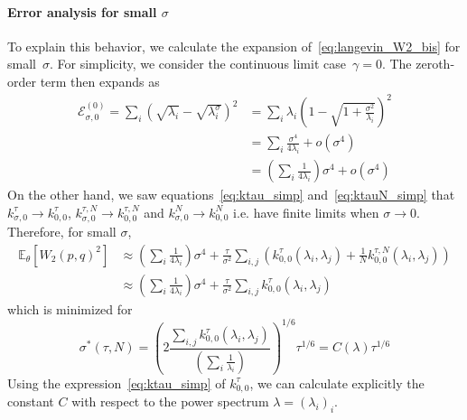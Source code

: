 \documentclass[11pt]{article}
\begin{document}
\paragraph{Error analysis for small $\sigma$}  To explain this behavior, we calculate the expansion of~\eqref{eq:langevin_W2_bis} for small~$\sigma$. For simplicity, we consider the continuous limit case~$\gamma = 0$. The zeroth-order term then expands as
\begin{align*}
    \mathcal{E}^{(0)}_{\sigma, 0} = \sum_i \left(\sqrt{\lambda_i} - \sqrt{\lambda_i^\sigma}\right)^2 &= \sum_i  \lambda_i \left( 1 - \sqrt{1 + \frac{\sigma^2}{\lambda_i}}\right)^2 \\
    &= \sum_i  \frac{\sigma^4}{4 \lambda_i} + o(\sigma^4) \\
    &= \left( \sum_i\frac{1}{4 \lambda_i} \right)\sigma^4 + o(\sigma^4)
\end{align*}
On the other hand, we saw equations~\eqref{eq:ktau_simp} and~\eqref{eq:ktauN_simp} that $k^\tau_{\sigma, 0} \to k^\tau_{0, 0}$, $k^{\tau,N}_{\sigma, 0} \to k^{\tau,N}_{0, 0}$ and $k^{N}_{\sigma, 0} \to k^{N}_{0, 0}$ i.e. have finite limits when $\sigma \to 0$. Therefore, for small $\sigma$,
\begin{align} \label{eq:langevin_W2_sigma_small}
 \! \! \mathbb{E}_{\theta}\left[  W_2\left(p, q\right)^2 \right] \! &\approx \left( \sum_i\frac{1}{4 \lambda_i} \right) \sigma^4 + \frac{\tau}{\sigma^2} \sum_{i,j}  \left(  k^\tau_{0, 0}(\lambda_i, \lambda_j) + \frac{1}{N} k^{\tau,N}_{0, 0}(\lambda_i, \lambda_j) \right) \\
&\approx \left( \sum_i\frac{1}{4 \lambda_i} \right) \sigma^4 + \frac{\tau}{\sigma^2} \sum_{i,j}  k^\tau_{0, 0}(\lambda_i, \lambda_j)  
\end{align} 
 which is minimized for
 \begin{equation} \label{eq:approx_sigma_star}
 \sigma^*(\tau, N) = \left( 2 \frac{ \sum_{i,j} k^\tau_{0, 0}(\lambda_i, \lambda_j)}{\left( \sum_i\frac{1}{\lambda_i} \right)} \right)^{1/6} \tau^{1/6} = C(\lambda) \tau^{1/6}
  \end{equation}
Using the expression~\eqref{eq:ktau_simp} of $k^\tau_{0, 0}$, we can calculate explicitly the constant $C$ with respect to the power spectrum $\lambda = (\lambda_i)_i$.
\end{document}
